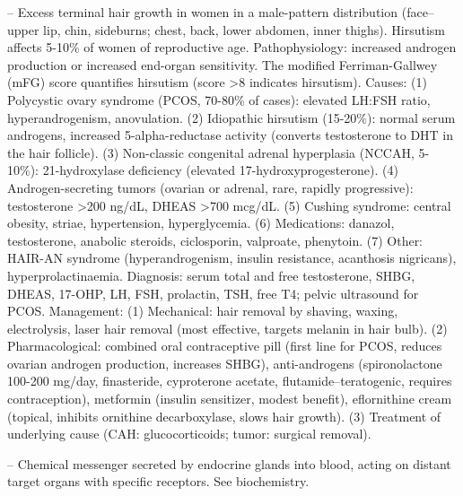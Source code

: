 -- Excess terminal hair growth in women in a male-pattern distribution (face--upper lip, chin, sideburns; chest, back, lower abdomen, inner thighs). Hirsutism affects 5-10\% of women of reproductive age. Pathophysiology: increased androgen production or increased end-organ sensitivity. The modified Ferriman-Gallwey (mFG) score quantifies hirsutism (score >8 indicates hirsutism). Causes: (1) Polycystic ovary syndrome (PCOS, 70-80\% of cases): elevated LH:FSH ratio, hyperandrogenism, anovulation. (2) Idiopathic hirsutism (15-20\%): normal serum androgens, increased 5-alpha-reductase activity (converts testosterone to DHT in the hair follicle). (3) Non-classic congenital adrenal hyperplasia (NCCAH, 5-10\%): 21-hydroxylase deficiency (elevated 17-hydroxyprogesterone). (4) Androgen-secreting tumors (ovarian or adrenal, rare, rapidly progressive): testosterone >200 ng/dL, DHEAS >700 mcg/dL. (5) Cushing syndrome: central obesity, striae, hypertension, hyperglycemia. (6) Medications: danazol, testosterone, anabolic steroids, ciclosporin, valproate, phenytoin. (7) Other: HAIR-AN syndrome (hyperandrogenism, insulin resistance, acanthosis nigricans), hyperprolactinaemia. Diagnosis: serum total and free testosterone, SHBG, DHEAS, 17-OHP, LH, FSH, prolactin, TSH, free T4; pelvic ultrasound for PCOS. Management: (1) Mechanical: hair removal by shaving, waxing, electrolysis, laser hair removal (most effective, targets melanin in hair bulb). (2) Pharmacological: combined oral contraceptive pill (first line for PCOS, reduces ovarian androgen production, increases SHBG), anti-androgens (spironolactone 100-200 mg/day, finasteride, cyproterone acetate, flutamide--teratogenic, requires contraception), metformin (insulin sensitizer, modest benefit), eflornithine cream (topical, inhibits ornithine decarboxylase, slows hair growth). (3) Treatment of underlying cause (CAH: glucocorticoids; tumor: surgical removal).

-- Chemical messenger secreted by endocrine glands into blood, acting on distant target organs with specific receptors. See biochemistry.

